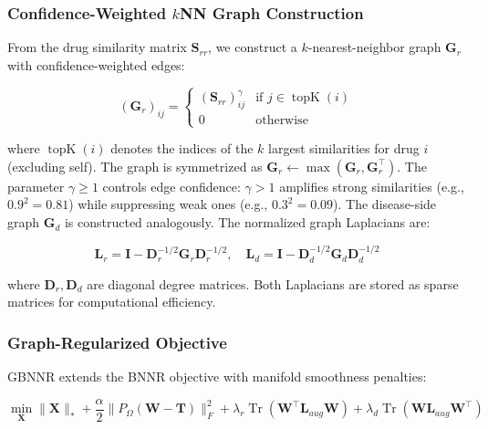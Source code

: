 \documentclass[unnumsec,webpdf,contemporary,large]{oup-authoring-template}
\begin{document}
\subsubsection{Confidence-Weighted $k$NN Graph Construction}
\label{sec:gbnnr_graph}

From the drug similarity matrix $\mathbf{S}_{rr}$, we construct a $k$-nearest-neighbor graph $\mathbf{G}_r$ with confidence-weighted edges:

\begin{equation}
(\mathbf{G}_r)_{ij} = \begin{cases}
(\mathbf{S}_{rr})_{ij}^\gamma & \text{if } j \in \operatorname{topK}(i) \\
0 & \text{otherwise}
\end{cases}
\label{eq:G_r}
\end{equation}

where $\operatorname{topK}(i)$ denotes the indices of the $k$ largest similarities for drug $i$ (excluding self). The graph is symmetrized as $\mathbf{G}_r \leftarrow \max(\mathbf{G}_r, \mathbf{G}_r^\top)$. The parameter $\gamma \geq 1$ controls edge confidence: $\gamma > 1$ amplifies strong similarities (e.g., $0.9^2 = 0.81$) while suppressing weak ones (e.g., $0.3^2 = 0.09$). The disease-side graph $\mathbf{G}_d$ is constructed analogously. The normalized graph Laplacians are:

\begin{equation}
\mathbf{L}_r = \mathbf{I} - \mathbf{D}_r^{-1/2} \mathbf{G}_r \mathbf{D}_r^{-1/2}, \quad \mathbf{L}_d = \mathbf{I} - \mathbf{D}_d^{-1/2} \mathbf{G}_d \mathbf{D}_d^{-1/2}
\label{eq:Laplacians}
\end{equation}

where $\mathbf{D}_r, \mathbf{D}_d$ are diagonal degree matrices. Both Laplacians are stored as sparse matrices for computational efficiency.

\subsubsection{Graph-Regularized Objective}
\label{sec:gbnnr_objective}

GBNNR extends the BNNR objective with manifold smoothness penalties:

\begin{equation}
\min_{\mathbf{X}} \|\mathbf{X}\|_* + \frac{\alpha}{2}\|P_\Omega(\mathbf{W} - \mathbf{T})\|_F^2 + \lambda_r \operatorname{Tr}(\mathbf{W}^\top \mathbf{L}_{aug} \mathbf{W}) + \lambda_d \operatorname{Tr}(\mathbf{W} \mathbf{L}_{aug} \mathbf{W}^\top)
\label{eq:gbnnr_obj}
\end{equation}
\end{document}
